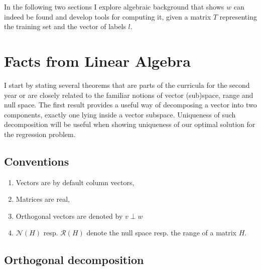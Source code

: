 \documentclass[a4paper]{article}
\theoremstyle{break}
\newcommand{\Nu}{\mathcal{N}}
\newcommand{\Ra}{\mathcal{R}}
\begin{document}
In the following two sections I explore algebraic background that shows $ w $ can indeed be found and develop tools for computing it, given a matrix $T$ representing the training set and the vector of labels $l$.

\section{Facts from Linear Algebra}

I start by stating several theorems that are parts of the curricula for the second year or are closely related to the familiar notions of vector (sub)space, range and null space. The first result provides a useful way of decomposing a vector into two components, exactly one lying inside a vector subspace. Uniqueness of such decomposition will be useful when showing uniqueness of our optimal solution for the regression problem.

\subsection{Conventions}
\begin{enumerate}
    \item Vectors are by default column vectors,
    \item Matrices are real,
    \item Orthogonal vectors are denoted by $ v \perp w$
    \item $\Nu(H)$ resp. $\Ra(H)$ denote the null space resp. the range of a matrix $H$.
\end{enumerate}

\subsection{Orthogonal decomposition}
\end{document}
